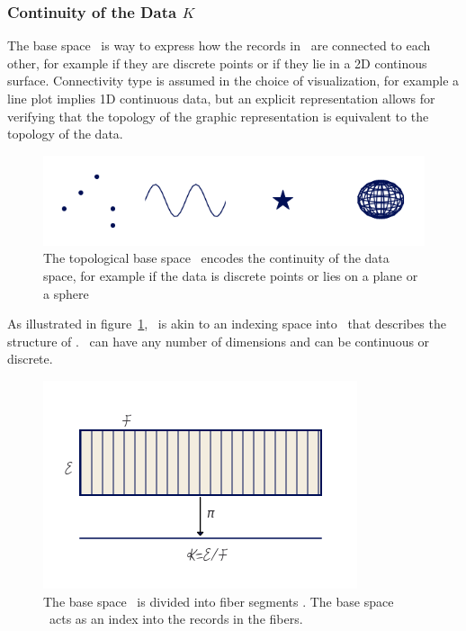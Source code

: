 \documentclass[../main.tex]{subfiles}
\begin{document}
\subsubsection{Continuity of the Data $K$} 
\label{sec:data_base}
The base space \dbase\ is way to express how the records in \dtotal\ are connected to each other, for example if they are discrete points or if they lie in a 2D continous surface. Connectivity type is assumed in the choice of visualization, for example a line plot implies 1D continuous data, but an explicit representation allows for verifying that the topology of the graphic representation is equivalent to the topology of the data.  

\begin{figure}[H]
    \includegraphics[width=1\textwidth]{figures/math/k_different_types.png}
    \caption{The topological base space \dbase\ encodes the continuity of the data space, for example if the data is discrete points or lies on a plane or a sphere}
    \label{fig:base_space_types}
\end{figure}
As illustrated in figure~\ref{fig:base_space_types}, \dbase\ is akin to an indexing space into \dtotal\ that describes the structure of \dtotal.  \dbase\ can have any number of dimensions and can be continuous or discrete. 

\begin{figure}[H]
    \includegraphics[width=\linewidth]{figures/math/k_qspace.png}
    \caption{The base space \dtotal\ is divided into fiber segments \dfiber. The base space \dbase\ acts as an index into the records in the fibers.}
    \label{fig:base_space_div}
\end{figure}
\end{document}
